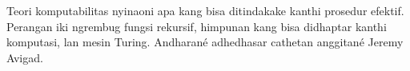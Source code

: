 \documentclass[../../include/open-logic-part]{subfiles}
\begin{document}

\begin{editorial}
Teori komputabilitas nyinaoni apa kang bisa ditindakake kanthi prosedur efektif. Perangan iki ngrembug fungsi rekursif, himpunan kang bisa didhaptar kanthi komputasi, lan mesin Turing. Andharané adhedhasar cathetan anggitané Jeremy Avigad.
\end{editorial}



\OLEndPartHook
\end{document}
